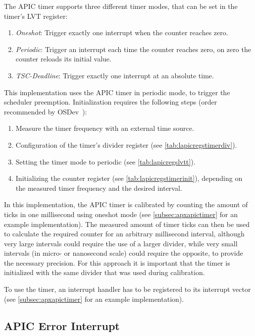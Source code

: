 The APIC timer supports three different timer modes, that can be set in the timer's LVT register:

\begin{enumerate}
  \item \textit{Oneshot}: Trigger exactly one interrupt when the counter reaches zero.
  \item \textit{Periodic}: Trigger an interrupt each time the counter reaches zero, on zero the counter reloads its initial value.
  \item \textit{TSC-Deadline}: Trigger exactly one interrupt at an absolute time.
\end{enumerate}

This implementation uses the APIC timer in periodic mode, to trigger the scheduler preemption.
Initialization requires the following steps (order recommended by OSDev~\autocite{osdev}):

\begin{enumerate}
  \item Measure the timer frequency with an external time source.
  \item Configuration of the timer's divider register (see \autoref{tab:lapicregstimerdiv}).
  \item Setting the timer mode to periodic (see \autoref{tab:lapicregslvtt}).
  \item Initializing the counter register (see \autoref{tab:lapicregstimerinit}), depending on the measured timer frequency and the desired interval.
\end{enumerate}

In this implementation, the APIC timer is calibrated by counting the amount of ticks in one millisecond using oneshot mode (see \autoref{subsec:apxapictimer} for an example implementation).
The measured amount of timer ticks can then be used to calculate the required counter for an arbitrary millisecond interval, although very large intervals could require the use of a larger divider, while very small intervals (in micro- or nanosecond scale) could require the opposite, to provide the necessary precision.
For this approach it is important that the timer is initialized with the same divider that was used during calibration.

To use the timer, an interrupt handler has to be registered to its interrupt vector (see \autoref{subsec:apxapictimer} for an example implementation).

\subsection{APIC Error Interrupt}
\label{subsec:lapicerror}

